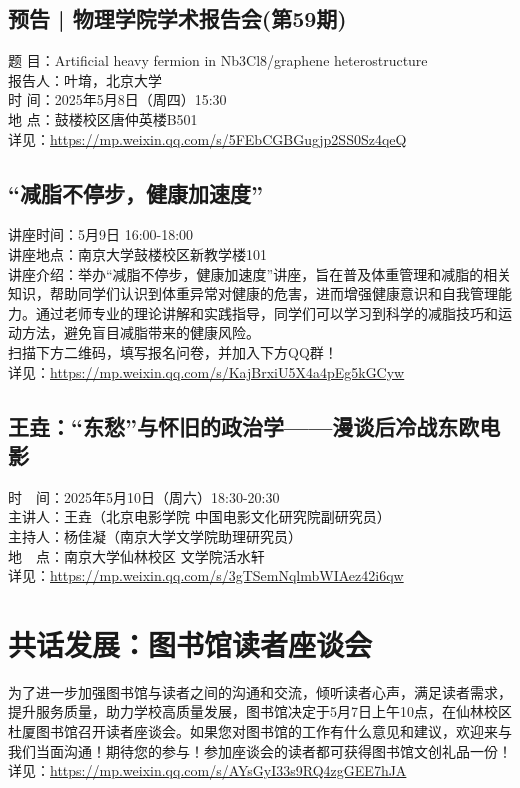 \documentclass[letterpaper, 12pt]{article}
\begin{document}
\begin{multicols}{2}
\subsection{预告 | 物理学院学术报告会(第59期)} %
题   目：Artificial heavy fermion in Nb3Cl8/graphene heterostructure
\\报告人：叶堉，北京大学
\\时   间：2025年5月8日（周四）15:30
\\地   点：鼓楼校区唐仲英楼B501
\\详见：\url{https://mp.weixin.qq.com/s/5FEbCGBGugjp2SS0Sz4qeQ}

\subsection{“减脂不停步，健康加速度”} %
讲座时间：5月9日 16:00-18:00
\\讲座地点：南京大学鼓楼校区新教学楼101
\\讲座介绍：举办“减脂不停步，健康加速度”讲座，旨在普及体重管理和减脂的相关知识，帮助同学们认识到体重异常对健康的危害，进而增强健康意识和自我管理能力。通过老师专业的理论讲解和实践指导，同学们可以学习到科学的减脂技巧和运动方法，避免盲目减脂带来的健康风险。
\\扫描下方二维码，填写报名问卷，并加入下方QQ群！
\\详见：\url{https://mp.weixin.qq.com/s/KajBrxiU5X4a4pEg5kGCyw}

\subsection{王垚：“东愁”与怀旧的政治学——漫谈后冷战东欧电影} %
时　间：2025年5月10日（周六）18:30-20:30
\\主讲人：王垚（北京电影学院  中国电影文化研究院副研究员）
\\主持人：杨佳凝（南京大学文学院助理研究员）
\\地　点：南京大学仙林校区 文学院活水轩
\\详见：\url{https://mp.weixin.qq.com/s/3gTSemNqlmbWIAez42i6qw}

\section{共话发展：图书馆读者座谈会} %
为了进一步加强图书馆与读者之间的沟通和交流，倾听读者心声，满足读者需求，提升服务质量，助力学校高质量发展，图书馆决定于5月7日上午10点，在仙林校区杜厦图书馆召开读者座谈会。如果您对图书馆的工作有什么意见和建议，欢迎来与我们当面沟通！期待您的参与！参加座谈会的读者都可获得图书馆文创礼品一份！
\\详见：\url{https://mp.weixin.qq.com/s/AYsGyI33s9RQ4zgGEE7hJA}



\end{multicols}
\end{document}
